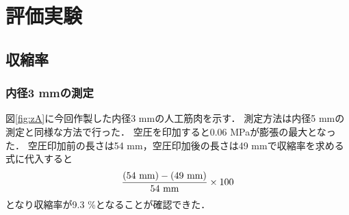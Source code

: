 \newpage
\section{評価実験}
\subsection{収縮率}
\subsubsection{内径3 mmの測定}
図\ref{fig:zA}に今回作製した内径3 mmの人工筋肉を示す．
測定方法は内径5 mmの測定と同様な方法で行った．
空圧を印加すると0.06 MPaが膨張の最大となった．
空圧印加前の長さは54 mm，空圧印加後の長さは49 mmで収縮率を求める式に代入すると
$$\frac{(54 ~\rm{mm})-(49 ~\rm{mm})}{54 ~\rm{mm}}\times 100\\$$
となり収縮率が9.3 \%となることが確認できた．
